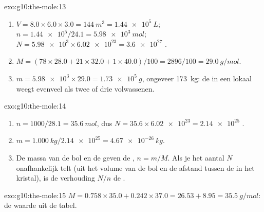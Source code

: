 \begin{solution}{exo:g10:the-mole:13}
\begin{enumerate}
  \item $V = 8.0 \times 6.0 \times 3.0 = \qty{144}{m^3} =
        \qty{1.44e5}{L}$; $n = \num{1.44e5} / 24.1 = \qty{5.98e3}{mol}$;
        $N = \num{5.98e3} \times \num{6.02e23} = \num{3.6e27}$ .
  \item $M = (78 \times 28.0 + 21 \times 32.0 + 1 \times 40.0) / 100 =
        2896 / 100 = \qty{29.0}{g/mol}$.
  \item $m = \num{5.98e3} \times 29.0 = \qty{1.73e5}{g}$, ongeveer
        \qty{173}{kg}: de  in een lokaal weegt evenveel als twee of
        drie volwassenen.
\end{enumerate}
\end{solution}

\begin{solution}{exo:g10:the-mole:14}
\begin{enumerate}
  \item $n = 1000 / 28.1 = \qty{35.6}{mol}$, dus
        $N = 35.6 \times \num{6.02e23} = \num{2.14e25}$ .
  \item $m = \qty{1.000}{kg} / \num{2.14e25} = \qty{4.67e-26}{kg}$.
  \item De massa van de bol en de  geven de , $n = m / M$. Als je het aantal  $N$ onafhankelijk telt
        (uit het volume van de bol en de afstand tussen de  in het
        kristal), is de verhouding $N / n$ de .
\end{enumerate}
\end{solution}

\begin{solution}{exo:g10:the-mole:15}
$M = 0.758 \times 35.0 + 0.242 \times 37.0 = 26.53 + 8.95 =
\qty{35.5}{g/mol}$: de waarde uit de tabel.
\end{solution}


